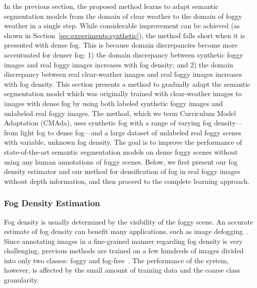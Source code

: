\documentclass[twocolumn]{svjour3}          \smartqed  \usepackage{graphicx}
\begin{document}
In the previous section, the proposed method learns to adapt semantic segmentation models from the domain of clear weather to the domain of foggy weather in a single step. While considerable improvement can be achieved (as shown in Section~\ref{sec:experiments:synthetic}), the method falls short when it is presented with dense fog. This is because domain discrepancies become more accentuated for denser fog: 1) the domain discrepancy between synthetic foggy images and real foggy images increases with fog density; and 2) the domain discrepancy between real clear-weather images and real foggy images increases with fog density. This section presents a method to gradually adapt the semantic segmentation model which was originally trained with clear-weather images to images with dense fog by using both labeled synthetic foggy images and unlabeled real foggy images. The method, which we term Curriculum Model Adaptation (CMAda), uses synthetic fog with a range of varying fog density---from light fog to dense fog---and a large dataset of unlabeled real foggy scenes with variable, unknown fog density. The goal is to improve the performance of state-of-the-art semantic segmentation models on dense foggy scenes without using any human annotations of foggy scenes. Below, we first present our fog density estimator and our method for densification of fog in real foggy images without depth information, and then proceed to the complete learning approach. 

\subsubsection{Fog Density Estimation}
\label{sec:fog:density:estimation}
Fog density is usually determined by the visibility of the foggy scene. An accurate estimate of fog density can benefit many applications, such as image defogging~\cite{fog:density:15}. Since annotating images in a fine-grained manner regarding fog density is very challenging, previous methods are trained on a few hundreds of images divided into only two classes: foggy and fog-free~\cite{fog:density:15}. The performance of the system, however, is affected by the small amount of training data and the coarse class granularity.
\end{document}
